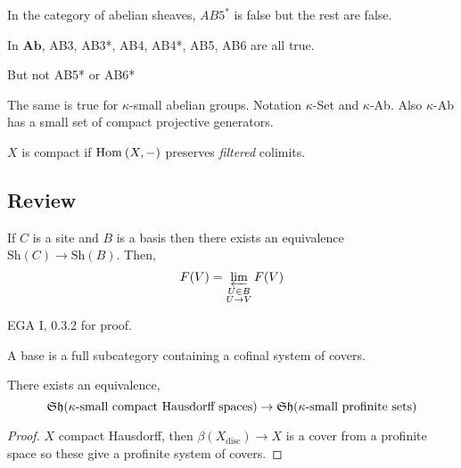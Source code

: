 \documentclass[12pt]{article}
\newcommand{\disc}{\text{disc}}
\begin{document}
\begin{rmk}
In the category of abelian sheaves, $AB5^*$ is false but the rest are false.
\end{rmk}

\begin{theorem}
In $\mathbf{Ab}$, AB3, AB3*, AB4, AB4*, AB5, AB6 are all true. 
\end{theorem}

\begin{rmk}
But not AB5* or AB6* 
\end{rmk}

\begin{theorem}
The same is true for $\kappa$-small abelian groups. Notation $\kappa$-Set and $\kappa$-Ab. Also $\kappa$-Ab has a small set of compact projective generators.
\end{theorem}

\begin{defn}
$X$ is compact if $\mathrm{Hom}_{} \left( X, - \right)$ preserves \textit{filtered} colimits. 
\end{defn}

\subsection{Review}

\begin{prop}
If $C$ is a site and $B$ is a basis then there exists an equivalence $\mathrm{Sh}(C) \to \mathrm{Sh}(B)$. Then,
\[ F(V) = \operatorname*{\varprojlim}_{\substack{U \in B \\ U \to V}} F(V) \]
\end{prop}

\begin{rmk}
EGA I, 0.3.2 for proof. 
\end{rmk}

\begin{rmk}
A base is a full subcategory containing a cofinal system of covers.
\end{rmk}

\begin{prop}
There exists an equivalence,
\[ \mathfrak{Sh}(\kappa\text{-small compact Hausdorff spaces}) \to \mathfrak{Sh}(\kappa\text{-small profinite sets}) \]
\end{prop}

\begin{proof}
$X$ compact Hausdorff, then $\beta(X_{\disc}) \to X$ is a cover from a profinite space so these give a profinite system of covers. 
\end{proof}
\end{document}
